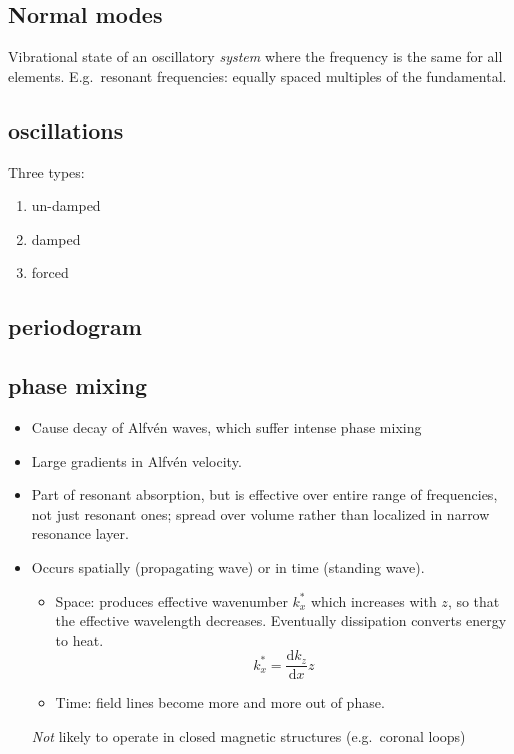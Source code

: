 \documentclass{article}
\begin{document}
\subsection{Normal modes}
Vibrational state of an oscillatory \emph{system} where the frequency
is the same for all elements. E.g.\ resonant frequencies: equally
spaced multiples of the fundamental.

\subsection{oscillations}
Three types:
\begin{enumerate}
    \item un-damped
    \item damped
    \item forced
\end{enumerate}

\subsection{periodogram}

\subsection{phase mixing}
\begin{itemize}
    \item Cause decay of Alfv\'en waves, which suffer intense phase mixing
    \item Large gradients in Alfv\'{e}n velocity.
    \item Part of resonant absorption, but is effective over entire range of frequencies,
        not just resonant ones; spread over volume rather than localized in
        narrow resonance layer.
    \item Occurs spatially (propagating wave) or in time (standing wave).
        \begin{itemize}
            \item Space: produces effective wavenumber $k_{x}^{*}$ which increases
                with $z$, so that the effective wavelength decreases. Eventually
                dissipation converts energy to heat.
                \[
                    k_{x}^{*} = \frac{\mathrm{d}k_{z}}{\mathrm{d}x}z
                    \]
            \item Time: field lines become more and more out of phase.
        \end{itemize}
        \emph{Not} likely to operate in closed magnetic structures
        (e.g.\ coronal loops)
\end{itemize}
\end{document}
